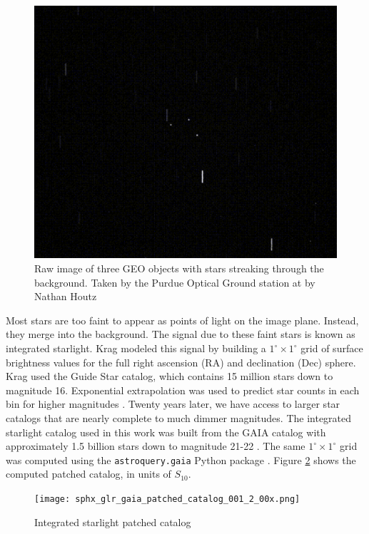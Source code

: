 \begin{figure}[ht]
  \centering
  \includegraphics[width=\figmed]{static_images/static_pogs_raw_image.png}
  \caption{Raw image of three GEO objects with stars streaking through the background. Taken by the Purdue Optical Ground station at \pogslla by Nathan Houtz}
  \label{fig:pollutionhemi}
\end{figure}

Most stars are too faint to appear as points of light on the image plane. Instead, they merge
into the background. The signal due to these faint stars is known as integrated starlight.
Krag \cite{krag2003} modeled this signal by building a $1^\circ \times 1^\circ$ grid of surface
brightness values for the full right ascension (RA) and declination (Dec) sphere. Krag used the
Guide Star catalog, which contains 15 million stars down to magnitude 16. Exponential extrapolation
was used to predict star counts in each bin for higher magnitudes \cite{krag2003}. Twenty years later, we have
access to larger star catalogs that are nearly complete to much dimmer magnitudes. The integrated
starlight catalog used in this work was built from the GAIA catalog with approximately 1.5 billion
stars down to magnitude 21-22 \cite{gaia_dr3}. The same $1^\circ \times 1^\circ$ grid was computed
using the \texttt{astroquery.gaia} Python package \cite{astroquery_gaia}. Figure
\ref{fig:gaiapatched} shows the computed patched catalog, in units of $S_{10}$. 

\begin{figure}[ht]
  \centering
  \texttt{[image: sphx\_glr\_gaia\_patched\_catalog\_001\_2\_00x.png]}
  \caption{Integrated starlight patched catalog}
  \label{fig:gaiapatched}
\end{figure}

